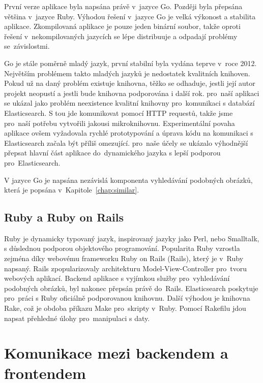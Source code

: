 První verze aplikace byla napsána právě v~jazyce Go. Později byla přepsána většina v~jazyce Ruby. Výhodou řešení v~jazyce Go je velká výkonost a stabilita aplikace. Zkompilovaná aplikace je pouze jeden binární soubor, takže oproti řešení v~nekompilovaných jazycích se lépe distribuuje a odpadají problémy se~závislostmi.

Go je stále poměrně mladý jazyk, první stabilní byla vydána teprve v~roce 2012\cite{golang-release}. Největším problémem takto mladých jazyků je nedostatek kvalitních knihoven. Pokud už na daný problém existuje knihovna, těžko se odhaduje, jestli její autor projekt neopustí a jestli bude knihovna podporována i další rok. pro~naší aplikaci se ukázal jako problém neexistence kvalitní knihovny pro~komunikaci s databází Elasticsearch. S tou jde komunikovat pomocí HTTP requestů, takže jsme pro~naší potřebu vytvořili jakousi mikroknihovnu. Experimentální povaha aplikace ovšem vyžadovala rychlé prototypování a úprava kódu na komunikaci s Elasticsearch začala být příliš omezující. pro~naše účely se ukázalo výhodnější přepsat hlavní část aplikace do~dynamického jazyka s lepší podporou pro~Elasticsearch.

V jazyce Go je napsána nezávislá komponenta vyhledávání podobných obrázků, která je popsána v~Kapitole~\ref{chap:similar}.

\subsection{Ruby a Ruby on Rails}

Ruby\cite{ruby} je dynamicky typovaný jazyk, inspirovaný jazyky jako Perl, nebo Smalltalk, s důslednou podporou objektového programování. Popularita Ruby vzrostla zejména díky webovému frameworku Ruby on Rails (Rails)\cite{rails}, který je v~Ruby napsaný. Rails zpopularizovaly architekturu Model-View-Controller\cite{mvc} pro~tvoru webových aplikací. Backend aplikace s vyjímkou služby pro~vyhledávání podobných obrázků, byl nakonec přepsán právě do~Rails. Elasticsearch poskytuje pro~práci s Ruby oficiálně podporovanou knihovnu\cite{elasticsearch-ruby}. Další výhodou je knihovna Rake, což je obdoba příkazu Make pro~skripty v~Ruby. Pomocí Rakefilu jdou napsat přehledné úlohy pro~manipulaci s daty. 

\section{Komunikace mezi backendem a frontendem}

